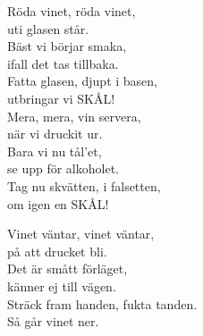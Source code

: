 \documentclass[a6paper,10pt]{article}
\begin{document}
\setlength{\oddsidemargin}{-0.47in}
\noindent
\begin{center}
\end{center}
\begin{lyrics}
Röda vinet, röda vinet,\\
uti glasen står.\\
Bäst vi börjar smaka,\\
ifall det tas tillbaka.\\
Fatta glasen, djupt i basen,\\
utbringar vi SKÅL!
\vspace{5pt}\\
Mera, mera, vin servera,\\
när vi druckit ur.\\
Bara vi nu tål'et,\\
se upp för alkoholet.\\
Tag nu skvätten, i falsetten,\\
om igen en SKÅL!
\end{lyrics}
\vspace{40pt}
\begin{center}
\end{center}
\begin{lyrics}
Vinet väntar, vinet väntar,\\
på att drucket bli.\\
Det är smått förläget,\\
känner ej till vägen.\\
Sträck fram handen, fukta tanden.\\
Så går vinet ner.
\end{lyrics}
\end{document}
